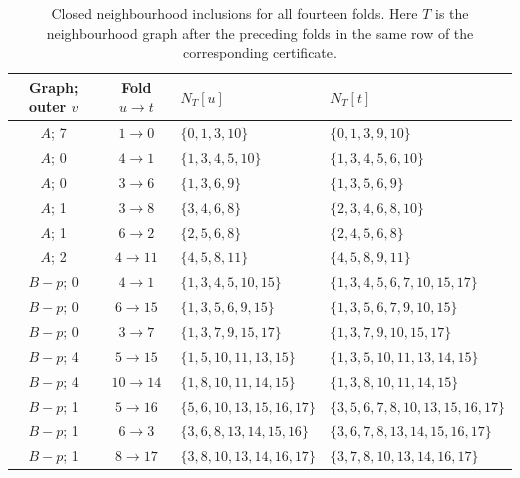 \begin{table}[H]
\centering\small\setlength{\tabcolsep}{4pt}
\caption{Closed neighbourhood inclusions for all fourteen folds. Here \(T\) is the neighbourhood graph after the preceding folds in the same row of the corresponding certificate.}\label{6k6:tab:inclusiones}
\begin{tabular}{c c p{} p{}}
\toprule
Graph; outer $v$ & Fold $u\to t$ & $N_T[u]$ & $N_T[t]$\\
\midrule

$A$; 7 & \(1\to 0\) & \(\{0,1,3,10\}\) & \(\{0,1,3,9,10\}\)\\
$A$; 0 & \(4\to 1\) & \(\{1,3,4,5,10\}\) & \(\{1,3,4,5,6,10\}\)\\
$A$; 0 & \(3\to 6\) & \(\{1,3,6,9\}\) & \(\{1,3,5,6,9\}\)\\
$A$; 1 & \(3\to 8\) & \(\{3,4,6,8\}\) & \(\{2,3,4,6,8,10\}\)\\
$A$; 1 & \(6\to 2\) & \(\{2,5,6,8\}\) & \(\{2,4,5,6,8\}\)\\
$A$; 2 & \(4\to 11\) & \(\{4,5,8,11\}\) & \(\{4,5,8,9,11\}\)\\
$B-p$; 0 & \(4\to 1\) & \(\{1,3,4,5,10,15\}\) & \(\{1,3,4,5,6,7,10,15,17\}\)\\
$B-p$; 0 & \(6\to 15\) & \(\{1,3,5,6,9,15\}\) & \(\{1,3,5,6,7,9,10,15\}\)\\
$B-p$; 0 & \(3\to 7\) & \(\{1,3,7,9,15,17\}\) & \(\{1,3,7,9,10,15,17\}\)\\
$B-p$; 4 & \(5\to 15\) & \(\{1,5,10,11,13,15\}\) & \(\{1,3,5,10,11,13,14,15\}\)\\
$B-p$; 4 & \(10\to 14\) & \(\{1,8,10,11,14,15\}\) & \(\{1,3,8,10,11,14,15\}\)\\
$B-p$; 1 & \(5\to 16\) & \(\{5,6,10,13,15,16,17\}\) & \(\{3,5,6,7,8,10,13,15,16,17\}\)\\
$B-p$; 1 & \(6\to 3\) & \(\{3,6,8,13,14,15,16\}\) & \(\{3,6,7,8,13,14,15,16,17\}\)\\
$B-p$; 1 & \(8\to 17\) & \(\{3,8,10,13,14,16,17\}\) & \(\{3,7,8,10,13,14,16,17\}\)\\
\bottomrule
\end{tabular}
\end{table}
